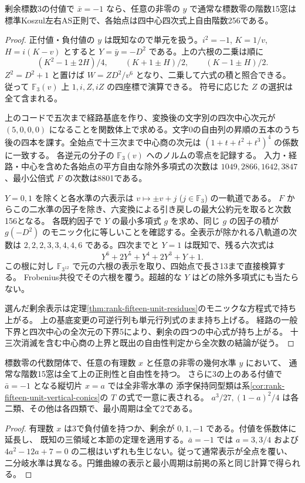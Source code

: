\begin{theorem}\label{thm:rank-fifteen-all-negative-unit-residues}
剰余標数3の付値で $\bar x=-1$ なら、任意の非零の $y$ で通常な標数零の階数15窓は
標準Koszul左右AS正則で、各始点は四中心四次式上自由階数256である。
\end{theorem}
\begin{proof}
正付値・負付値の $y$ は既知なので単元を扱う。$i^2=-1$, $K=1/v$,
$H=i(K-v)$ とすると $Y=\bar y=-D^2$ である。上の六根の二乗は順に
\[
 (K^2-1\pm2H)/4,\qquad (K+1\pm H)/2,\qquad (K-1\pm H)/2 .
\]
$Z^2=D^2+1$ と置けば $W=Z D^2/v^6$ となり、二乗して六式の積と照合できる。
従って $\mathbb F_3(v)$ 上 $1,i,Z,iZ$ の四座標で演算できる。
符号に応じた $Z$ の選択は全て含まれる。

上のコードで五次まで経路基底を作り、変換後の文字別の四次中心次元が
$(5,0,0,0)$ になることを関数体上で求める。文字0の自由列の昇順の五本のうち
後の四本を課す。全始点で十三次まで中心商の次元は $(1+t+t^2+t^3)^4$ の係数に一致する。
各逆元の分子の $\mathbb F_3(v)$ へのノルムの零点を記録する。
入力・経路・中心を含めた各始点の平方自由な除外多項式の次数は
$1049,2866,1642,3847$、最小公倍式 $F$ の次数は8801である。

$Y=0,1$ を除くと各水準の六表示は $v\mapsto\pm v+j$ ($j\in\mathbb F_3$) の一軌道である。
$F$ からこの二水準の因子を除き、六変換による引き戻しの最大公約元を取ると次数156となる。
各既約因子で $Y$ の最小多項式 $g$ を求め、同じ $g$ の因子の積が
$g(-D^2)$ のモニック化に等しいことを確認する。全表示が除かれる八軌道の次数は
$2,2,2,3,3,4,4,6$ である。四次までと $Y=1$ は既知で、残る六次式は
\[
 Y^6+2Y^5+Y^4+2Y^3+Y+1 .
\]
この根に対し $\mathbb F_{3^{12}}$ で元の六根の表示を取り、四始点で長さ13まで直接検算する。
Frobenius共役でその六根を覆う。超越的な $Y$ はどの除外多項式にも当たらない。

選んだ剰余表示は定理\ref{thm:rank-fifteen-unit-residues}のモニックな方程式で持ち上がる。
上の基底変更の可逆行列も単元行列式のまま持ち上げる。
経路の一般下界と四次中心の全次元の下界5により、剰余の四つの中心式が持ち上がる。
十三次消滅を含む中心商の上界と既出の自由性判定から全次数の結論が従う。
\end{proof}

\begin{corollary}
標数零の代数閉体で、任意の有理数 $x$ と任意の非零の幾何水準 $y$ において、
通常な階数15窓は全て上の正則性と自由性を持つ。
さらに3の上のある付値で $\bar a=-1$ となる縦切片 $x=a$ では全非零水準の
添字保持同型類は系\ref{cor:rank-fifteen-unit-vertical-conics}の $T$ の式で一意に表される。
$a^3/27,(1-a)^2/4$ は各二類、その他は各四類で、最小周期は全て2である。
\end{corollary}
\begin{proof}
有理数 $x$ は3で負付値を持つか、剰余が $0,1,-1$ である。付値を係数体に延長し、
既知の三領域と本節の定理を適用する。$\bar a=-1$ では $a=3,3/4$ および
$4a^2-12a+7=0$ の二根はいずれも生じない。従って通常表示が全点を覆い、
二分岐水準は異なる。円錐曲線の表示と最小周期は前掲の系と同じ計算で得られる。
\end{proof}
